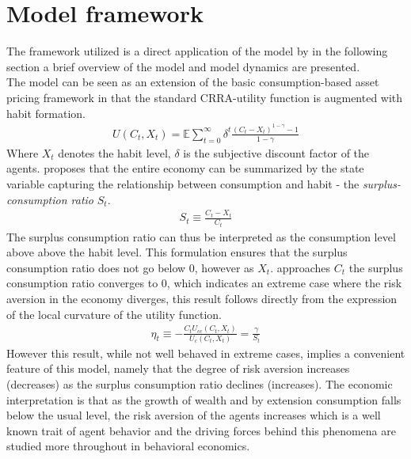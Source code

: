 \section{Model framework} \label{sec:Methodology}

The framework utilized is a direct application of the model by \citet{Campbell1999} in the following section a brief overview of the model and model dynamics are presented.\\
The model can be seen as an extension of the basic consumption-based asset pricing framework in that the standard CRRA-utility function is augmented with habit formation. 
\begin{align}
   U(C_t, X_t) = \mathbb{E} \sum _ {t = 0} ^{\infty} \delta ^ t \frac{\left( C_t - X_t\right)^{1-\gamma } - 1}{1-\gamma }
\end{align}
Where $X_t$ denotes the habit level, $\delta$ is the subjective discount factor  of the agents. \citet{Campbell1999} proposes that the entire economy can be summarized by the state variable capturing the relationship between consumption and habit - the \textit{surplus-consumption ratio} $S_t$.
\begin{align}
   S_t \equiv \frac{C_t - X_t}{C_t} \label{S_t_Process}
\end{align}
The surplus consumption ratio can thus be interpreted as the consumption level above above the habit level. This formulation ensures that the surplus consumption ratio does not go below 0, however as $X_t$. approaches $C_t$ the surplus consumption ratio converges to $0$, which indicates an extreme case where the risk aversion in the economy diverges, this result follows directly from the expression of the local curvature of the utility function.
\begin{align}
    \eta _t \equiv - \frac{C_t U_{cc}\left( C_t, X_t \right)}{U_{c} \left( C_t, X_t \right)} = \frac{\gamma}{S_t}
    \end{align}
However this result, while not well behaved in extreme cases, implies a convenient feature of this model, namely that the degree of risk aversion increases (decreases) as the surplus consumption ratio declines (increases). The economic interpretation is that as the growth of wealth and by extension consumption falls below the usual level, the risk aversion of the agents increases which is a well known trait of agent behavior and the driving forces behind this phenomena are studied more throughout in behavioral economics.\\
\newline
